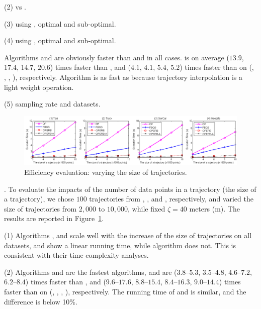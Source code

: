 \sstab (2) \ped vs \sed.

\sstab (3) using \ped, optimal and sub-optimal.

\sstab (4) using \sed, optimal and sub-optimal.

Algorithms \operb and \operba are obviously faster than \dpa and \fbqsa in all cases.
\operb is on average ($13.9$, $17.4$, $14.7$, {$20.6$}) times faster than \dpa, and ($4.1$, $4.1$, $5.4$, {$5.2$}) times faster than \fbqsa on (\taxi, \truck, \sercar, {\geolife}), respectively. Algorithm \operba is as fast as \operb because trajectory interpolation is a light weight operation.

\sstab (5) sampling rate and datasets.


\begin{figure}[tb!]
	\centering
	\includegraphics[scale = 0.465]{figures/Exp-time-size.png}
	\vspace{-2.5ex}
	\caption{\small Efficiency evaluation: varying the size of trajectories.}\label{fig:time-size}
	\vspace{-1ex}
\end{figure}

.
To evaluate the impacts of the number of data points in a trajectory (\ie the size of a trajectory),
we chose $100$ trajectories from \taxi, \truck, \sercar and \geolife, respectively,
and varied the size  of trajectories from $2,000$ to $10,000$, while fixed $\zeta = 40$ meters (m).
The results are reported in Figure~\ref{fig:time-size}.

\sstab(1) Algorithms \operb, \operba and \fbqsa  scale well with the increase of the size of trajectories on all datasets,
and show a linear running time, while algorithm \dpa does not.
This is consistent with their time complexity analyses.

\sstab(2) Algorithms \operb and \operba are the fastest \lsa algorithms, and are {($3.8$--$5.3$, $3.5$--$4.8$, $4.6$--$7.2$, $6.2$--$8.4$)} times faster than \fbqsa,
and {($9.6$--$17.6$, $8.8$--$15.4$, $8.4$--$16.3$, $9.0$--$14.4$)} times faster than \dpa on (\taxi, \truck, \sercar, \geolife), respectively. The running time of \operb and \operba is similar, and the difference is below 10\%.















